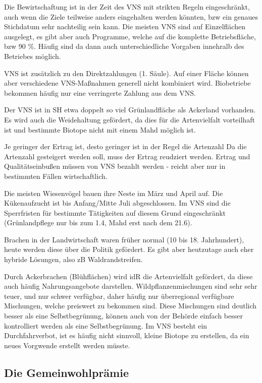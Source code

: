 \documentclass[11pt]{scrbook}
\begin{document}
Die Bewirtschaftung ist in der Zeit des \ac{VNS} mit strikten Regeln eingeschränkt, auch wenn die Ziele teilweise anders eingehalten werden könnten, bzw ein genaues Stichdatum sehr nachteilig sein kann.
Die meisten \ac{VNS} sind auf Einzelflächen ausgelegt, es gibt aber auch Programme, welche auf die komplette Betriebsfläche, bzw 90 \%.
Häufig sind da dann auch unterschiedliche Vorgaben innehralb des Betriebes möglich.

\ac{VNS} ist zusätzlich zu den Direktzahlungen (1. Säule).
Auf einer Fläche können aber verschiedene \ac{VNS}-Maßnahmen generell nicht kombiniert wird.
Biobetriebe bekommen häufig nur eine verringerte Zahlung aus dem \ac{VNS}.

Der \ac{VNS} ist in SH etwa doppelt so viel Grünlandfläche als Ackerland vorhanden.
Es wird auch die Weidehaltung gefördert, da dies für die Artenvielfalt vorteilhaft ist und bestimmte Biotope nicht mit einem Mahd möglich ist.

Je geringer der Ertrag ist, desto geringer ist in der Regel die Artenzahl
Da die Artenzahl gesteigert werden soll, muss der Ertrag reudziert werden.
Ertrag und Qualitätseinbußen müssen von \ac{VNS} bezahlt werden - reicht aber nur in bestimmten Fällen wirtschaftlich.

Die meisten Wiesenvögel bauen ihre Neste im März und April auf.
Die Kükenaufzucht ist bis Anfang/Mitte Juli abgeschlossen.
Im \ac{VNS} sind die Sperrfristen für bestimmte Tätigkeiten auf diesem Grund eingeschränkt (Grünlandpflege nur bis zum 1.4, Mahd erst nach dem 21.6).

Brachen in der Landwirtschaft waren früher normal (10 bis 18. Jahrhundert), heute werden diese über die Politik gefördert.
Es gibt aber heutzutage auch eher hybride Lösungen, also zB Waldrandstreifen.

Durch Ackerbrachen (Blühflächen) wird idR die Artenvielfalt gefördert, da diese auch häufig Nahrungsangebote darstellen.
Wildpflanzenmischungen sind sehr sehr teuer, und nur schwer verfügbar, daher häufig nur überregional verfügbare Mischungen, welche preiswert zu bekommen sind.
Diese Mischungen sind deutlich besser als eine Selbstbegrünung, können auch von der Behörde einfach besser kontrolliert werden als eine Selbstbegrünung.
Im \ac{VNS} besteht ein Durchfahrverbot, ist es häufig nicht sinnvoll, kleine Biotope zu erstellen, da ein neues Vorgwende erstellt werden müsste.

\subsection{Die Gemeinwohlprämie}
\end{document}
